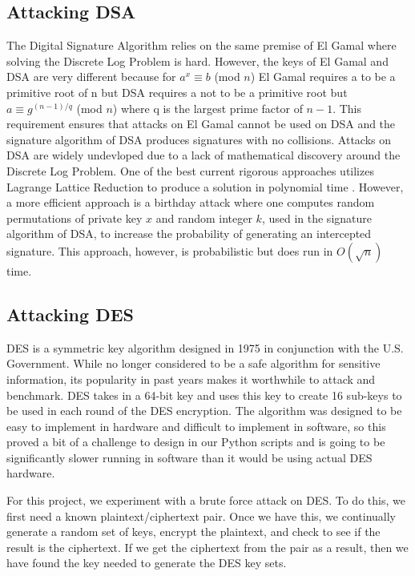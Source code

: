 \documentclass[12pt]{report}
\begin{document}
\subsection{Attacking DSA}
The Digital Signature Algorithm relies on the same premise of El Gamal where solving the Discrete Log Problem is hard. However, the keys of El Gamal and DSA are very different because for $a^{x} \equiv b$ (mod $n$) El Gamal requires a to be a primitive root of n but DSA requires a not to be a primitive root but $a \equiv g^{(n-1)/q}$ (mod $n$) where q is the largest prime factor of $n-1$. This requirement ensures that attacks on El Gamal cannot be used on DSA and the signature algorithm of DSA produces signatures with no collisions. Attacks on DSA are widely undevloped due to a lack of mathematical discovery around the Discrete Log Problem. One of the best current rigorous approaches utilizes Lagrange Lattice Reduction to produce a solution in polynomial time \cite{lattice}. However, a more efficient approach is a birthday attack where one computes random permutations of private key $x$ and random integer $k$, used in the signature algorithm of DSA, to increase the probability of generating an intercepted signature. This approach, however, is probabilistic but does run in $O(\sqrt{n})$ time.

\subsection{Attacking DES}
DES is a symmetric key algorithm designed in 1975 in conjunction with the U.S. Government. While no longer considered to be a safe algorithm for sensitive information, its popularity in past years makes it worthwhile to attack and benchmark. DES takes in a 64-bit key and uses this key to create 16 sub-keys to be used in each round of the DES encryption. The algorithm was designed to be easy to implement in hardware and difficult to implement in software, so this proved a bit of a challenge to design in our Python scripts and is going to be significantly slower running in software than it would be using actual DES hardware.

For this project, we experiment with a brute force attack on DES. To do this, we first need a known plaintext/ciphertext pair. Once we have this, we continually generate a random set of keys, encrypt the plaintext, and check to see if the result is the ciphertext. If we get the ciphertext from the pair as a result, then we have found the key needed to generate the DES key sets.
\end{document}
